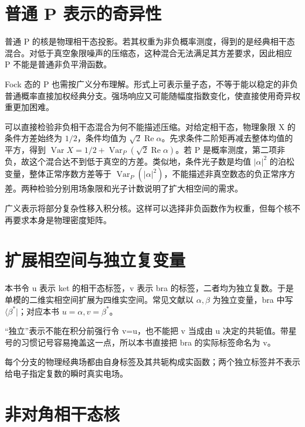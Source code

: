 \documentclass[UTF8,a4paper,zihao=-4,openany,fontset=fandol]{ctexbook}
\begin{document}
\section{普通 P 表示的奇异性}\label{sec:10:1}


普通 P 的核是物理相干态投影。若其权重为非负概率测度，得到的是经典相干态混合。对低于真空象限噪声的压缩态，这种混合无法满足其方差要求，因此相应 P 不能是普通非负平滑函数。



Fock 态的 P 也需按广义分布理解。形式上可表示量子态，不等于能以稳定的非负普通概率直接加权经典分支。强场响应又可能随幅度指数变化，使直接使用奇异权重更加困难。



可以直接检验非负相干态混合为何不能描述压缩。对给定相干态，物理象限 X 的条件方差始终为 $1/2$，条件均值为 $\sqrt2\operatorname{Re}\alpha$。先求条件二阶矩再减去整体均值的平方，得到 $\operatorname{Var} X=1/2+\operatorname{Var}_P(\sqrt2\operatorname{Re}\alpha)$。若 P 是概率测度，第二项非负，故这个混合达不到低于真空的方差。类似地，条件光子数是均值 $|\alpha|^2$ 的泊松变量，整体正常序数方差等于 $\operatorname{Var}_P(|\alpha|^2)$，不能描述非真空数态的负正常序方差。两种检验分别用场象限和光子计数说明了扩大相空间的需求。



广义表示将部分复杂性移入积分核。这样可以选择非负函数作为权重，但每个核不再要求本身是物理密度矩阵。



\section{扩展相空间与独立复变量}\label{sec:10:2}


本书令 u 表示 ket 的相干态标签，v 表示 bra 的标签，二者均为独立复数。于是单模的二维实相空间扩展为四维实空间。常见文献以 $\alpha,\beta$ 为独立变量，bra 中写 $\langle\beta^*|$；对应本书 $u=\alpha,v=\beta^*$。



“独立”表示不能在积分前强行令 v=u，也不能把 v 当成由 u 决定的共轭值。带星号的习惯记号容易掩盖这一点，所以本书直接把 bra 的实际标签命名为 v。



每个分支的物理经典场都由自身标签及其共轭构成实函数；两个独立标签并不表示给电子指定复数的瞬时真实电场。



\section{非对角相干态核}\label{sec:10:3}
\end{document}
